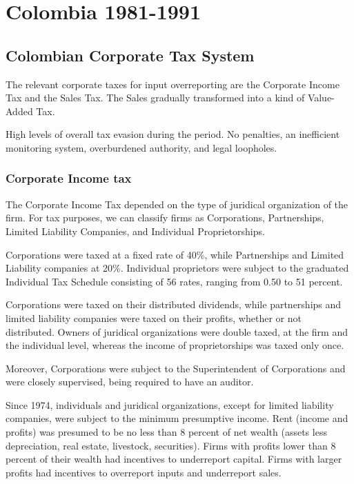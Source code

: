 \documentclass[
  12pt]{article}
\begin{document}
\section{Colombia 1981-1991}\label{colombia-1981-1991}

\subsection{Colombian Corporate Tax
System}\label{colombian-corporate-tax-system}

The relevant corporate taxes for input overreporting are the Corporate
Income Tax and the Sales Tax. The Sales gradually transformed into a
kind of Value-Added Tax.

High levels of overall tax evasion during the period. No penalties, an
inefficient monitoring system, overburdened authority, and legal
loopholes.

\subsubsection{Corporate Income tax}\label{corporate-income-tax}

The Corporate Income Tax depended on the type of juridical organization
of the firm. For tax purposes, we can classify firms as Corporations,
Partnerships, Limited Liability Companies, and Individual
Proprietorships.

Corporations were taxed at a fixed rate of 40\%, while Partnerships and
Limited Liability companies at 20\%. Individual proprietors were subject
to the graduated Individual Tax Schedule consisting of 56 rates, ranging
from 0.50 to 51 percent.

Corporations were taxed on their distributed dividends, while
partnerships and limited liability companies were taxed on their
profits, whether or not distributed. Owners of juridical organizations
were double taxed, at the firm and the individual level, whereas the
income of proprietorships was taxed only once.

Moreover, Corporations were subject to the Superintendent of
Corporations and were closely supervised, being required to have an
auditor.

Since 1974, individuals and juridical organizations, except for limited
liability companies, were subject to the minimum presumptive income.
Rent (income and profits) was presumed to be no less than 8 percent of
net wealth (assets less depreciation, real estate, livestock,
securities). Firms with profits lower than 8 percent of their wealth had
incentives to underreport capital. Firms with larger profits had
incentives to overreport inputs and underreport sales.
\end{document}
